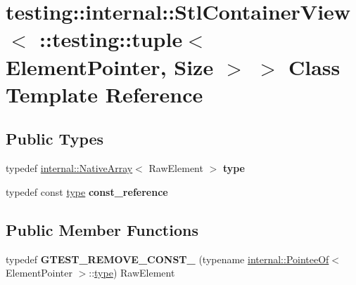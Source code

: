 \hypertarget{classtesting_1_1internal_1_1_stl_container_view_3_01_1_1testing_1_1tuple_3_01_element_pointer_00_01_size_01_4_01_4}{}\section{testing\+:\+:internal\+:\+:Stl\+Container\+View$<$ \+:\+:testing\+:\+:tuple$<$ Element\+Pointer, Size $>$ $>$ Class Template Reference}
\label{classtesting_1_1internal_1_1_stl_container_view_3_01_1_1testing_1_1tuple_3_01_element_pointer_00_01_size_01_4_01_4}
\subsection*{Public Types}
\begin{DoxyCompactItemize}
\item 
\mbox{\label{classtesting_1_1internal_1_1_stl_container_view_3_01_1_1testing_1_1tuple_3_01_element_pointer_00_01_size_01_4_01_4_aedefb897170f76518afbca6f87b5467c}} 
typedef \mbox{\hyperlink{classtesting_1_1internal_1_1_native_array}{internal\+::\+Native\+Array}}$<$ Raw\+Element $>$ {\bfseries type}
\item 
\mbox{\label{classtesting_1_1internal_1_1_stl_container_view_3_01_1_1testing_1_1tuple_3_01_element_pointer_00_01_size_01_4_01_4_a4c69a4e22173b0e6f3eb55636d6a38f1}} 
typedef const \mbox{\hyperlink{classtesting_1_1internal_1_1_native_array}{type}} {\bfseries const\+\_\+reference}
\end{DoxyCompactItemize}
\subsection*{Public Member Functions}
\begin{DoxyCompactItemize}
\item 
\mbox{\label{classtesting_1_1internal_1_1_stl_container_view_3_01_1_1testing_1_1tuple_3_01_element_pointer_00_01_size_01_4_01_4_a2b1dd06842cb431ef647b85707ce52ff}} 
typedef {\bfseries G\+T\+E\+S\+T\+\_\+\+R\+E\+M\+O\+V\+E\+\_\+\+C\+O\+N\+S\+T\+\_\+} (typename \mbox{\hyperlink{structtesting_1_1internal_1_1_pointee_of}{internal\+::\+Pointee\+Of}}$<$ Element\+Pointer $>$\+::\mbox{\hyperlink{classtesting_1_1internal_1_1_native_array}{type}}) Raw\+Element
\end{DoxyCompactItemize}
